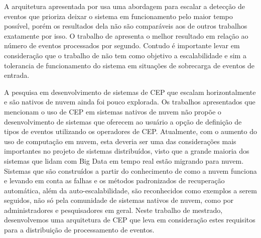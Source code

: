 A arquitetura apresentada por \cite{6906776} usa uma abordagem para escalar a detecção de eventos que prioriza deixar o sistema em funcionamento pelo maior tempo possível, porém os resultados dela não são comparáveis aos de outros trabalhos exatamente por isso. O trabalho de \cite{Isoyama:2012:SCE:2335484.2335498} apresenta o melhor resultado em relação ao número de eventos processados por segundo. Contudo é importante levar em consideração que o trabalho de \cite{6906776} não tem como objetivo a escalabilidade e sim a tolerancia de funcionamento do sistema em situações de sobrecarga de eventos de entrada.



A pesquisa em desenvolvimento de sistemas de CEP que escalam horizontalmente e são nativos de nuvem ainda foi pouco explorada. Os trabalhos apresentados que mencionam o uso de CEP em sistemas nativos de nuvem não propõe o desenvolvimento de sistemas que oferecem ao usuário a opção de definição de tipos de eventos utilizando os operadores de CEP. Atualmente, com o aumento do uso de computação em nuvem, esta deveria ser uma das considerações mais importantes no projeto de sistemas distribuídos, visto que a grande maioria dos sistemas que lidam com Big Data em tempo real estão migrando para nuvem. Sistemas que são construídos a partir do conhecimento de como a nuvem funciona e levando em conta as falhas e os métodos padronizados de recuperação automática, além da auto-escalabilidade, são reconhecidos como exemplos a serem seguidos, não só pela comunidade de sistemas nativos de nuvem, como por administradores e pesquisadores em geral.
Neste trabalho de mestrado, desenvolvemos uma arquitetura de CEP que leva em consideração estes requisitos para a distribuição de processamento de eventos.




